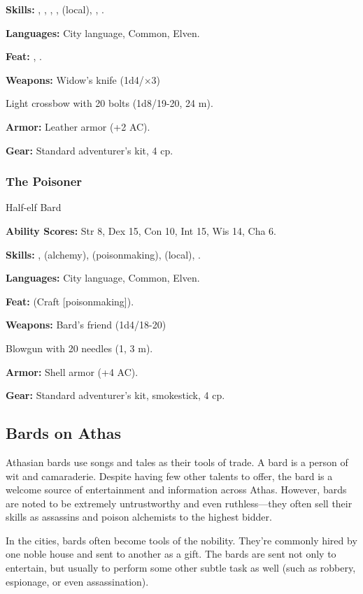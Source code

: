\textbf{Skills:} , , , ,  (local), , .

\textbf{Languages:} City language, Common, Elven.

\textbf{Feat:} , .

\textbf{Weapons:} Widow's knife (1d4/$\times$3)

Light crossbow with 20 bolts (1d8/19-20, 24 m).

\textbf{Armor:} Leather armor (+2 AC).

\textbf{Gear:} Standard adventurer's kit, 4 cp.

\subsubsection{The Poisoner}
Half-elf Bard

\textbf{Ability Scores:} Str 8, Dex 15, Con 10, Int 15, Wis 14, Cha 6.

\textbf{Skills:} ,  (alchemy),  (poisonmaking),  (local), .

\textbf{Languages:} City language, Common, Elven.

\textbf{Feat:}  (Craft [poisonmaking]).

\textbf{Weapons:} Bard's friend (1d4/18-20)

Blowgun with 20 needles (1, 3 m).

\textbf{Armor:} Shell armor (+4 AC).

\textbf{Gear:} Standard adventurer's kit, smokestick, 4 cp.

\subsection{Bards on Athas}

Athasian bards use songs and tales as their tools of trade. A bard is a person of wit and camaraderie. Despite having few other talents to offer, the bard is a welcome source of entertainment and information across Athas. However, bards are noted to be extremely untrustworthy and even ruthless---they often sell their skills as assassins and poison alchemists to the highest bidder.

In the cities, bards often become tools of the nobility. They're commonly hired by one noble house and sent to another as a gift. The bards are sent not only to entertain, but usually to perform some other subtle task as well (such as robbery, espionage, or even assassination).

